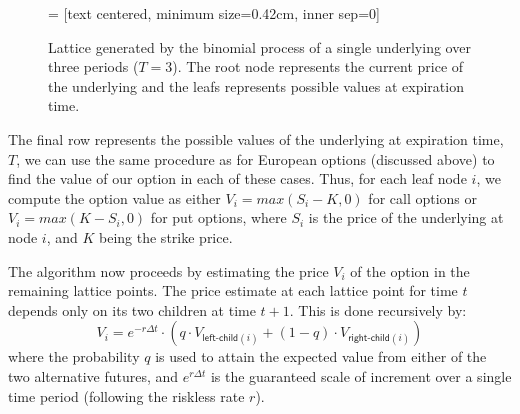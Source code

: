 \begin{figure}
  \centering
   = [text centered, minimum size=0.42cm, inner sep=0]


\vspace{2mm}

\caption{Lattice generated by the binomial process of a single
  underlying over three periods ($T=3$). The root
  node represents the current price of the underlying and the leafs
  represents possible values at expiration time.}
\label{fig:binomial-tree}
\end{figure}

The final row represents the possible values of the underlying at
expiration time, $T$, we can use the same procedure as for European
options (discussed above) to find the value of our option in each of
these cases. Thus, for each leaf node $i$, we compute the option value
as either $V_{i} = max(S_{i}-K, 0)$ for call options or $V_{i} =
max(K-S_{i},0)$ for put options, where $S_i$ is the price of the
underlying at node $i$, and $K$ being the strike price.

The algorithm now proceeds by estimating the price $V_i$ of the option
in the remaining lattice points. The price estimate at each lattice
point for time $t$ depends only on its two children at time
$t+1$. This is done recursively by:
$$V_{i} = e^{-r\Delta t} \cdot (q\cdot V_{\mathsf{left\textsf{-}child}(i)} + (1-q)\cdot V_{\mathsf{right\textsf{-}child}(i)})$$
where the probability $q$ is used to attain the expected value from
either of the two alternative futures, and $e^{r\Delta t}$ is the
guaranteed scale of increment over a single time period (following the
riskless rate $r$).

